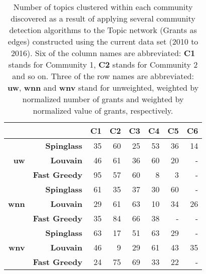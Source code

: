 \begin{table}[!htbp]
\centering
\caption[Number of topics clustered within each community discovered in the Topic network (Grants as edges) constructed using the current data set (2010 to 2016)]{Number of topics clustered within each community discovered as a result of applying several community detection algorithms to the Topic network (Grants as edges) constructed using the current data set (2010 to 2016). Six of the column names are abbreviated: \textbf{C1} stands for Community 1, \textbf{C2} stands for Community 2 and so on. Three of the row names are abbreviated: \textbf{uw}, \textbf{wnn} and \textbf{wnv} stand for unweighted, weighted by normalized number of grants and weighted by normalized value of grants, respectively.}
\label{table:topic_a_current_numbers_appendix}
\begin{tabular}{r|r|r|r|r|r|r|r}
\textbf{} & \textbf{} & \textbf{C1} & \textbf{C2} & \textbf{C3} & \textbf{C4} & \textbf{C5} & \textbf{C6}\\
\hline
\multirow{3}{*}{\textbf{uw}}
& \textbf{Spinglass}   & {35} & {60} & {25} & {53} & {36} & {14}\\
& \textbf{Louvain}     & {46} & {61} & {36} & {60} & {20} & {-}\\
& \textbf{Fast Greedy} & {95} & {57} & {60} & {8} & {3}   & {-}\\
\hline
\multirow{3}{*}{\textbf{wnn}}
& \textbf{Spinglass}   & {61} & {35} & {37} & {30} & {60} & {-}\\
& \textbf{Louvain}     & {29} & {61} & {63} & {10} & {34} & {26}\\
& \textbf{Fast Greedy} & {35} & {84} & {66} & {38} & {-}  & {-}\\
\hline
\multirow{3}{*}{\textbf{wnv}}
& \textbf{Spinglass}   & {63} & {17} & {51} & {63} & {29} & {-}\\
& \textbf{Louvain}     & {46} & {9}  & {29} & {61} & {43} & {35}\\
& \textbf{Fast Greedy} & {24} & {75} & {69} & {33} & {22} & {-}
\end{tabular}
\end{table}

